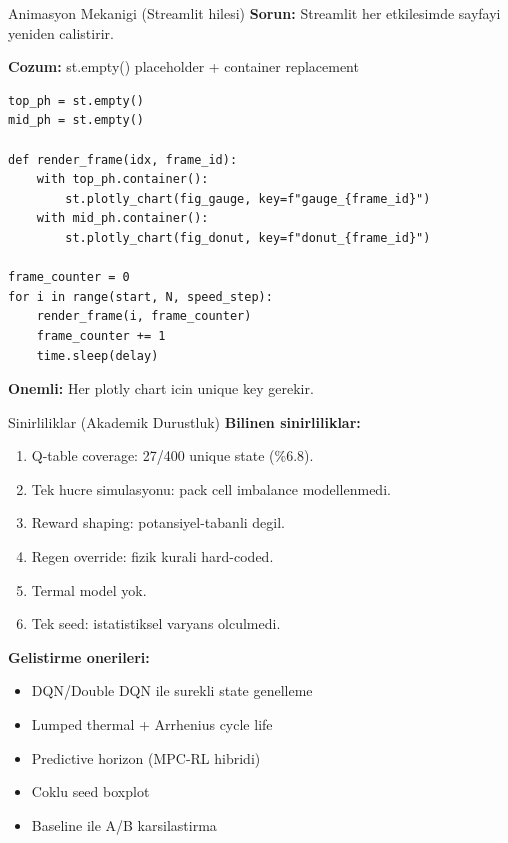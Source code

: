 \documentclass[10pt,aspectratio=169]{beamer}
\begin{document}
\begin{frame}[fragile]{Animasyon Mekanigi (Streamlit hilesi)}
\textbf{Sorun:} Streamlit her etkilesimde sayfayi yeniden calistirir.

\textbf{Cozum:} st.empty() placeholder + container replacement
\begin{lstlisting}[style=py]
top_ph = st.empty()
mid_ph = st.empty()

def render_frame(idx, frame_id):
    with top_ph.container():
        st.plotly_chart(fig_gauge, key=f"gauge_{frame_id}")
    with mid_ph.container():
        st.plotly_chart(fig_donut, key=f"donut_{frame_id}")

frame_counter = 0
for i in range(start, N, speed_step):
    render_frame(i, frame_counter)
    frame_counter += 1
    time.sleep(delay)
\end{lstlisting}

\textbf{Onemli:} Her plotly chart icin unique key gerekir.
\end{frame}

\begin{frame}{Sinirliliklar (Akademik Durustluk)}
\textbf{Bilinen sinirliliklar:}
\begin{enumerate}\footnotesize
  \item Q-table coverage: 27/400 unique state (\%6.8).
  \item Tek hucre simulasyonu: pack cell imbalance modellenmedi.
  \item Reward shaping: potansiyel-tabanli degil.
  \item Regen override: fizik kurali hard-coded.
  \item Termal model yok.
  \item Tek seed: istatistiksel varyans olculmedi.
\end{enumerate}

\vspace{0.4em}
\textbf{Gelistirme onerileri:}
\begin{itemize}\footnotesize
  \item DQN/Double DQN ile surekli state genelleme
  \item Lumped thermal + Arrhenius cycle life
  \item Predictive horizon (MPC-RL hibridi)
  \item Coklu seed boxplot
  \item Baseline ile A/B karsilastirma
\end{itemize}
\end{frame}
\end{document}

